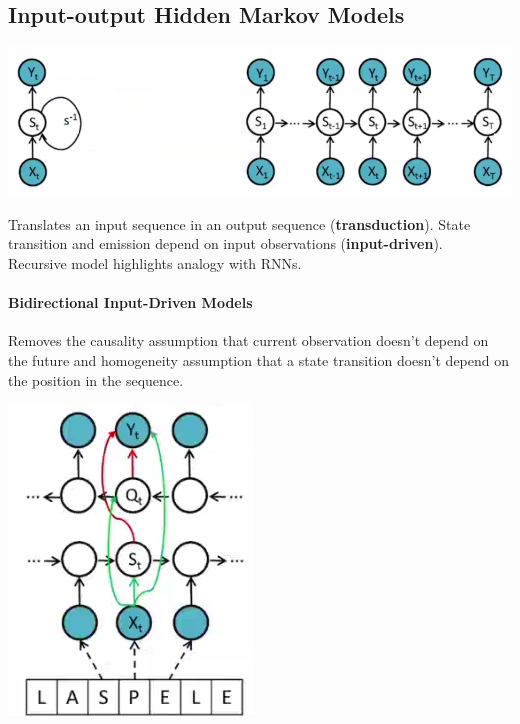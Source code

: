 \documentclass[10pt]{report}
\begin{document}
\subsection{Input-output Hidden Markov Models}
\begin{center}
	\includegraphics[scale=0.5]{31.png}
\end{center}
Translates an input sequence in an output sequence (\textbf{transduction}). State transition and emission depend on input observations (\textbf{input-driven}).\\
Recursive model highlights analogy with RNNs.
\paragraph{Bidirectional Input-Driven Models} Removes the causality assumption that current observation doesn't depend on the future and homogeneity assumption that a state transition doesn't depend on the position in the sequence.
\begin{center}
	\includegraphics[scale=0.5]{33.png}
\end{center}
\end{document}
